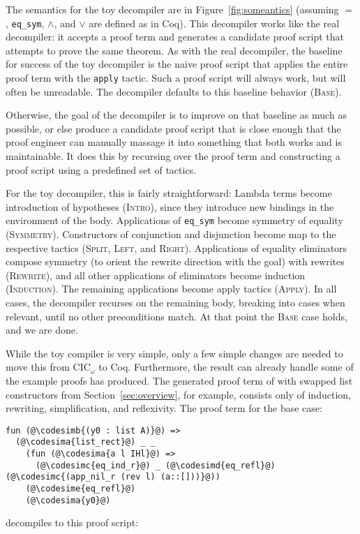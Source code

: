 The semantics for the toy decompiler are in Figure~\ref{fig:someantics} (assuming $=$, \lstinline{eq_sym}, $\wedge$, and $\vee$ are defined as in Coq).
This decompiler works like the real decompiler: it accepts a proof term and generates a candidate proof script that attempts to prove the same theorem.
As with the real decompiler, the baseline for success of the toy decompiler is the naive proof script
that applies the entire proof term with the \lstinline{apply} tactic.
Such a proof script will always work, but will often be unreadable.
The decompiler defaults to this baseline behavior (\textsc{Base}).

Otherwise, the goal of the decompiler is to improve on that baseline as much as possible,
or else produce a candidate proof script that is close enough that the proof engineer can manually massage it into something that
both works and is maintainable.
It does this by recursing over the proof term and constructing a proof script using a predefined set of tactics.

For the toy decompiler, this is fairly straightforward: Lambda terms become introduction of hypotheses (\textsc{Intro}), since they introduce new bindings
in the environment of the body. Applications of \lstinline{eq_sym} become symmetry of equality (\textsc{Symmetry}).
Constructors of conjunction and disjunction become map to the respective tactics (\textsc{Split}, \textsc{Left}, and \textsc{Right}).
Applications of equality eliminators compose symmetry (to orient the rewrite direction with the goal) with rewrites (\textsc{Rewrite}),
and all other applications of eliminators become induction (\textsc{Induction}).
The remaining applications become apply tactics (\textsc{Apply}).
In all cases, the decompiler recurses on the remaining body, breaking into cases when relevant, until no other preconditions match.
At that point the \textsc{Base} case holds, and we are done.

While the toy compiler is very simple, only a few simple changes are needed
to move this from CIC$_{\omega}$ to Coq.
Furthermore, the result can already handle some of the example proofs \toolname has produced.
The generated proof term of  with swapped list constructors from Section~\ref{sec:overview},
for example, consists only of induction, rewriting, simplification, and reflexivity.
The proof term for the base case:

\begin{lstlisting}
fun (@\codesimb{(y0 : list A)}@) =>
  (@\codesima{list_rect}@) _ _
    (fun (@\codesima{a l IHl}@) =>
      (@\codesimc{eq_ind_r}@) _ (@\codesimd{eq_refl}@) (@\codesimc{(app_nil_r (rev l) (a::[]))}@))
    (@\codesime{eq_refl}@)
    (@\codesima{y0}@)
\end{lstlisting}
decompiles to this proof script:

